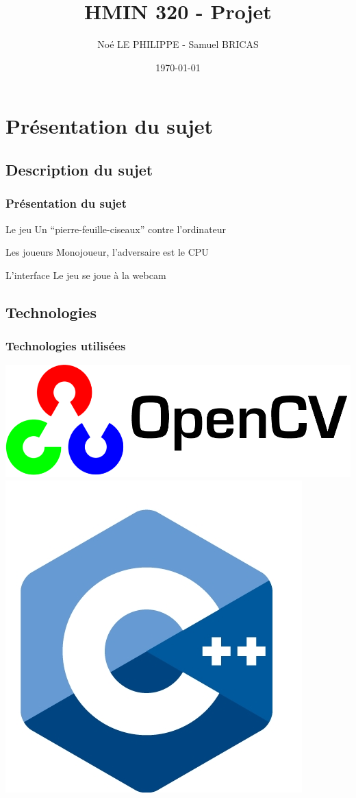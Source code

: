 \documentclass{beamer}
\title{HMIN 320 - Projet}
\author{Noé LE PHILIPPE - Samuel BRICAS}
\institute{Université de Montpellier}
\date{\today}
\begin{document}
\begin{frame}
  \titlepage
\end{frame}

\section{Présentation du sujet}
\subsection{Description du sujet}
\begin{frame}
  \frametitle{Présentation du sujet}
  \begin{block}{Le jeu}
    Un ``pierre-feuille-ciseaux'' contre l'ordinateur
  \end{block}
  \begin{block}{Les joueurs}
    Monojoueur, l'adversaire est le CPU
  \end{block}
  \begin{block}{L'interface}
    Le jeu se joue à la webcam
  \end{block}
\end{frame}
\subsection{Technologies}
\begin{frame}
  \frametitle{Technologies utilisées}
  \includegraphics[scale=0.8]{./opencv_logo.png}
  \includegraphics[scale=0.2]{./cpp.jpeg}
\end{frame}
\end{document}
